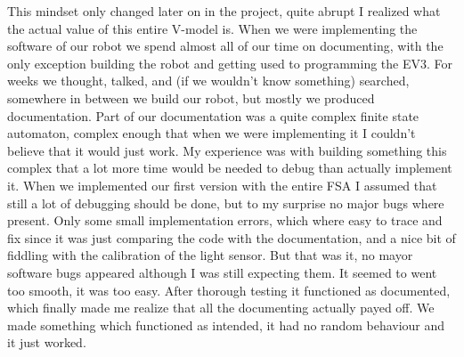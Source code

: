 This mindset only changed later on in the project, quite abrupt I realized what the actual value of this entire V-model is. When we were implementing the software of our robot we spend almost all of our time on documenting, with the only exception building the robot and getting used to programming the EV3. For weeks we thought, talked, and (if we wouldn’t know something) searched, somewhere in between we build our robot, but mostly we produced documentation. Part of our documentation was a quite complex finite state automaton, complex enough that when we were implementing it I couldn’t believe that it would just work. My experience was with building something this complex that a lot more time would be needed to debug than actually implement it. When we implemented our first version with the entire FSA I assumed that still a lot of debugging should be done, but to my surprise no major bugs where present. Only some small implementation errors, which where easy to trace and fix since it was just comparing the code with the documentation, and a nice bit of fiddling with the calibration of the light sensor. But that was it, no mayor software bugs appeared although I was still expecting them. It seemed to went too smooth, it was too easy. After thorough testing it functioned as documented, which finally made me realize that all the documenting actually payed off. We made something which functioned as intended, it had no random behaviour and it just worked.